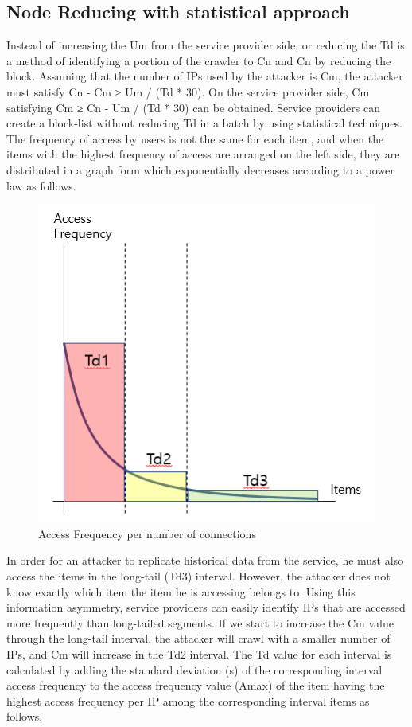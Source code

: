 \documentclass[letterpaper, 10 pt, conference]{ieeeconf}
\begin{document}
\subsection{Node Reducing with statistical approach}
Instead of increasing the Um from the service provider side, or reducing the Td is a method of identifying a portion of the crawler to Cn and Cn by reducing the block.
Assuming that the number of IPs used by the attacker is Cm, the attacker must satisfy Cn - Cm ≥ Um / (Td * 30). On the service provider side, Cm satisfying Cm ≥ Cn - Um / (Td * 30) can be obtained.
Service providers can create a block-list without reducing Td in a batch by using statistical techniques. The frequency of access by users is not the same for each item, and when the items with the highest frequency of access are arranged on the left side, they are distributed in a graph form which exponentially decreases according to a power law as follows.

\begin{figure}[H]
    \includegraphics[width=1.0\columnwidth]{figs/figure_01.png}
    \caption{Access Frequency per number of connections}
    \label{fig:my_label}
\end{figure}

In order for an attacker to replicate historical data from the service, he must also access the items in the long-tail (Td3) interval. However, the attacker does not know exactly which item the item he is accessing belongs to. Using this information asymmetry, service providers can easily identify IPs that are accessed more frequently than long-tailed segments. If we start to increase the Cm value through the long-tail interval, the attacker will crawl with a smaller number of IPs, and Cm will increase in the Td2 interval.
The Td value for each interval is calculated by adding the standard deviation (s) of the corresponding interval access frequency to the access frequency value (Amax) of the item having the highest access frequency per IP among the corresponding interval items as follows. 
\end{document}
